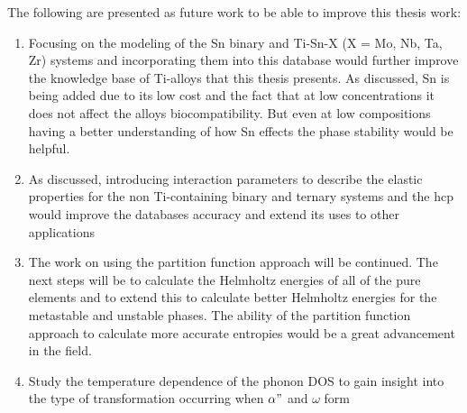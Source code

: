 The following are presented as future work to be able to improve this thesis work:
\begin{enumerate}
	\item Focusing on the modeling of the Sn binary and Ti-Sn-X (X = Mo, Nb, Ta, Zr) systems and incorporating them into this database would further improve the knowledge base of Ti-alloys that this thesis presents. As discussed, Sn is being added due to its low cost and the fact that at low concentrations it does not affect the alloys biocompatibility. But even at low compositions having a better understanding of how Sn effects the phase stability would be helpful.
	\item As discussed, introducing interaction parameters to describe the elastic properties for the non Ti-containing binary and ternary systems and the hcp would improve the databases accuracy and extend its uses to other applications
	\item The work on using the partition function approach will be continued. The next steps will be to calculate the Helmholtz energies of all of the pure elements and to extend this to calculate better Helmholtz energies for the metastable  and unstable phases. The ability of the partition function approach to calculate more accurate entropies would be a great advancement in the field. 
	\item Study the temperature dependence of the phonon DOS to gain insight into the type of transformation occurring when $\alpha"$ and $\omega$ form
\end{enumerate}
